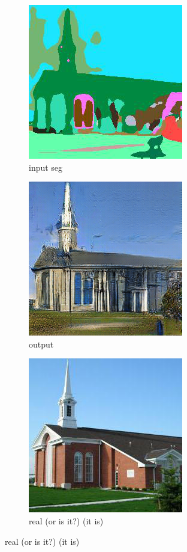 \documentclass{article}
\begin{document}
\begin{figure}[h!]
    \caption{Segmentations and generated/real images from our pix2pix}
    \centering
    \begin{subfigure}[h!]{0.3\textwidth}
        \caption{input seg}
        \includegraphics[scale=0.3]{110008_real_A.png}
    \end{subfigure}
     \begin{subfigure}[h!]{0.3\textwidth}
        \caption{output}
        \includegraphics[scale=0.3]{110008_fake_B.png}
    \end{subfigure}
     \begin{subfigure}[h!]{0.3\textwidth}
        \caption{real (or is it?) (it is)}
        \includegraphics[scale=0.3]{110008_real_B.png}

\end{subfigure}
\end{figure}
\end{document}
